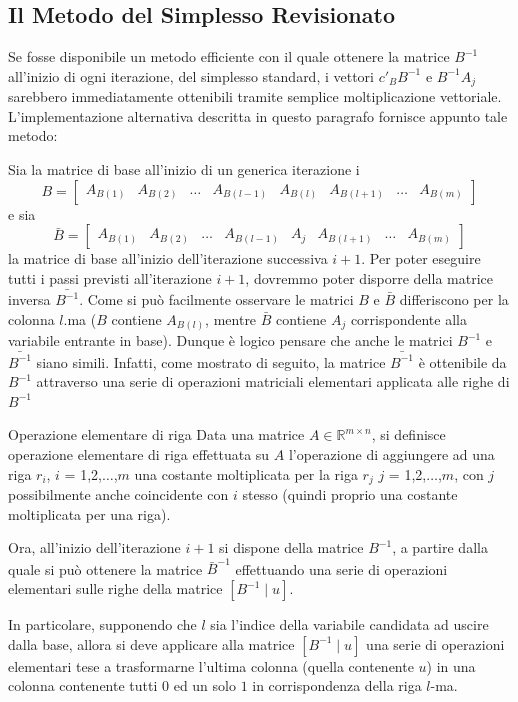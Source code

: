 \subsection{Il Metodo del Simplesso Revisionato}
Se fosse disponibile un metodo efficiente con il quale ottenere la matrice $B^{-1}$ all'inizio di ogni iterazione, del simplesso standard, i vettori $c'_BB^{-1}$ e $B^{-1}A_j$ sarebbero immediatamente ottenibili tramite semplice moltiplicazione vettoriale.
L'implementazione alternativa descritta in questo paragrafo fornisce appunto tale metodo:

Sia la matrice di base all'inizio di un generica iterazione i
\[
B = \begin{bmatrix} A_{B(1)} & A_{B(2)} & \dots & A_{B(l-1)} & A_{B(l)} & A_{B(l+1)} & \dots & A_{B(m)} \end{bmatrix}
\]
e sia 
\[
\bar{B} = \begin{bmatrix} A_{B(1)} & A_{B(2)} & \dots & A_{B(l-1)} & A_j & A_{B(l+1)} & \dots & A_{B(m)} \end{bmatrix}
\]  
la matrice di base all'inizio dell'iterazione successiva $i+1$.
Per poter eseguire tutti i passi previsti all'iterazione $i + 1$, dovremmo poter disporre della matrice inversa $\bar{B^{-1}}$.
Come si può facilmente osservare le matrici $B$ e $\bar{B}$ differiscono per la colonna $l$.ma ($B$ contiene $A_{B(l)}$, mentre $\bar{B}$ contiene $A_j$ corrispondente alla variabile entrante in base).
Dunque è logico pensare che anche le matrici $B^{-1}$ e $\bar{B^{-1}}$ siano simili.
Infatti, come mostrato di seguito, la matrice $\bar{B^{-1}}$ è ottenibile da $B^{-1}$ attraverso una serie di operazioni matriciali elementari applicata alle righe di $B^{-1}$

\begin{definition}{Operazione elementare di riga}
Data una matrice $A \in \mathbb{R}^{m \times n}$, si definisce operazione elementare di riga effettuata su $A$ l'operazione di aggiungere ad una riga $r_i$, $i$ = 1,2,$\dots$,$m$ una costante moltiplicata per la riga $r_j$ $j$ = 1,2,$\dots$,$m$, con $j$ possibilmente anche coincidente con $i$ stesso (quindi proprio una costante moltiplicata per una riga).
\end{definition}


Ora, all'inizio dell'iterazione $i+1$ si dispone della matrice
$B^{-1}$, a partire dalla quale si può ottenere la matrice
$\bar{B}^{-1}$ effettuando una serie di operazioni elementari
sulle righe della matrice $[B^{-1}\mid u]$.

In particolare, supponendo che $l$ sia l'indice della variabile
candidata ad uscire dalla base, allora si deve applicare alla
matrice $[B^{-1}\mid u]$ una serie di operazioni elementari
tese a trasformarne l'ultima colonna (quella contenente $u$)
in una colonna contenente tutti $0$ ed un solo $1$ in
corrispondenza della riga $l$-ma.

